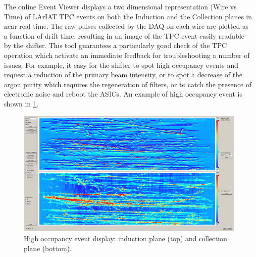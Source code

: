 The online Event Viewer displays a two dimensional representation (Wire vs Time) of LArIAT TPC events  on both the Induction and the Collection planes in near real time. The raw pulses collected by the DAQ on each wire are plotted as a function of drift time, resulting in an image of the TPC event easily readable by the shifter. This tool guarantees a particularly good  check of the TPC operation which activate an immediate feedback for troubleshooting a number of issues. For example,  it easy for the shifter to spot high occupancy events and request a reduction of the primary beam intensity, or to spot a decrease of the argon purity which requires the regeneration of filters, or to catch the presence of electronic noise and reboot the ASICs. An example of high occupancy event is shown in \ref{fig:highOcc}.

\begin{figure}[htb]
\centering
\includegraphics[scale=0.2]{Chapter-3/Images/highOccupancy.png}
\caption{High occupancy event display: induction plane (top) and collection plane (bottom).}
\label{fig:highOcc}
\end{figure}


